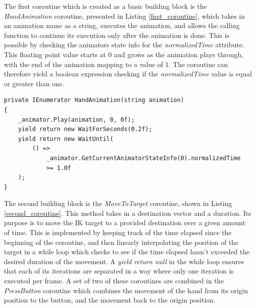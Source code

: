 The first coroutine which is created as a basic building block is the
\textit{HandAnimation} coroutine, presented in Listing \ref{first_coroutine},
which takes in an animation name as a string, executes the animation, and allows
the calling function to continue its execution only after the animation is done.
This is possible by checking the animators state info for the
\textit{normalizedTime} attribute. This floating point value starts at 0 and
grows as the animation plays through, with the end of the animation mapping to
a value of 1. The coroutine can therefore yield a boolean expression checking if
the \textit{normalizedTime} value is equal or greater than one. 

\begin{lstlisting}[basicstyle=\footnotesize, numbers=none,frame=single,
caption={A coroutine which plays a designated animation and relinquishes control
to the main loop once the animation is finished. \textit{IKPressButton.cs}},captionpos=b,
label=first_coroutine, language={[Sharp]c}, float=tp]
private IEnumerator HandAnimation(string animation)
{
    _animator.Play(animation, 0, 0f);
    yield return new WaitForSeconds(0.2f);
    yield return new WaitUntil(
        () =>
            _animator.GetCurrentAnimatorStateInfo(0).normalizedTime
            >= 1.0f
    );
}
\end{lstlisting}

The second building block is the \textit{MoveToTarget} coroutine, shown in
Listing \ref{second_coroutine}. This method
takes in a destination vector and a duration. Its purpose is to move the IK
target to a provided destination over a given amount of time. This is
implemented by keeping track of the time elapsed since the beginning of the
coroutine, and then linearly interpolating the position of the target
in a while loop which checks to see if the time elapsed hasn't exceeded the
desired duration of the movement. A \textit{yield return null} in the while loop
ensures that each of its iterations are separated in a way where only one
iteration is executed per frame. A set of two of these coroutines are combined
in the \textit{PressButton} coroutine which combines the movement of the hand
from its origin position to the button, and the movement back to the origin
position.

